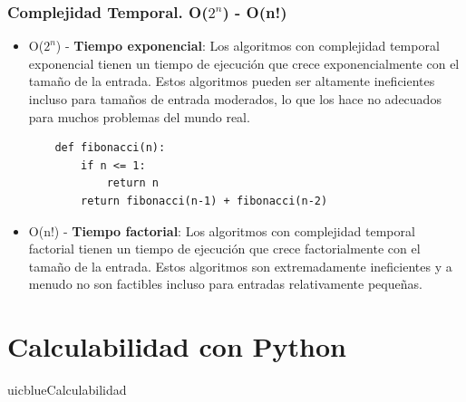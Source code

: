 \documentclass[xcolor=table]{beamer}
\begin{document}
\begin{frame} [fragile] \frametitle{Complejidad Temporal. O($2^n$) - O(n!) } \footnotesize

\begin{itemize}


    \item O($2^n$) - \textbf{Tiempo exponencial}: Los algoritmos con complejidad temporal exponencial tienen un tiempo de ejecución que crece exponencialmente con el tamaño de la entrada. Estos algoritmos pueden ser altamente ineficientes incluso para tamaños de entrada moderados, lo que los hace no adecuados para muchos problemas del mundo real.

    \begin{verbatim}
    def fibonacci(n):
        if n <= 1:
            return n
        return fibonacci(n-1) + fibonacci(n-2)
    \end{verbatim}


    \item O(n!) - \textbf{Tiempo factorial}: Los algoritmos con complejidad temporal factorial tienen un tiempo de ejecución que crece factorialmente con el tamaño de la entrada. Estos algoritmos son extremadamente ineficientes y a menudo no son factibles incluso para entradas relativamente pequeñas.  
\end{itemize}
\end{frame} 
    
\section{Calculabilidad con Python}
\begin{chapter}{uicblue}{Calculabilidad}
\end{chapter}
\end{document}
